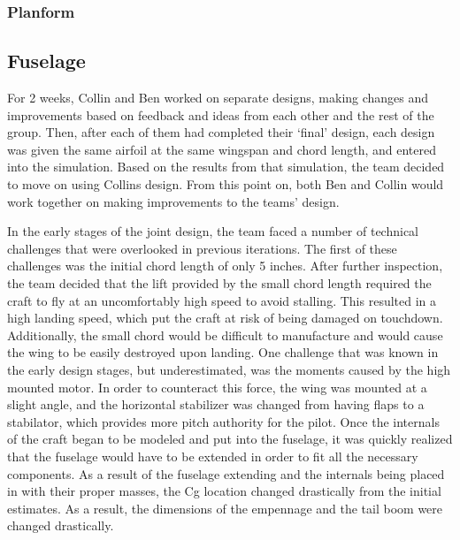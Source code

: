 \documentclass[letterpaper,12pt]{article}
\begin{document}
\subsubsection{Planform}\label{sec:studies:wing:form} %



\subsection{Fuselage}\label{sec:studies:fuse}
For 2 weeks, Collin and Ben worked on separate designs, making changes and improvements based on feedback and ideas from each other and the rest of the group. Then, after each of them had completed their ‘final’ design, each design was given the same airfoil at the same wingspan and chord length, and entered into the simulation. Based on the results from that simulation, the team decided to move on using Collins design. From this point on, both Ben and Collin would work together on making improvements to the teams’ design. 
    
In the early stages of the joint design, the team faced a number of technical challenges that were overlooked in previous iterations. The first of these challenges was the initial chord length of only 5 inches. After further inspection, the team decided that the lift provided by the small chord length required the craft to fly at an uncomfortably high speed to avoid stalling. This resulted in a high landing speed, which put the craft at risk of being damaged on touchdown. Additionally, the small chord would be difficult to manufacture and would cause the wing to be easily destroyed upon landing. One challenge that was known in the early design stages, but underestimated, was the moments caused by the high mounted motor. In order to counteract this force, the wing was mounted at a slight angle, and the horizontal stabilizer was changed from having flaps to a stabilator, which provides more pitch authority for the pilot. Once the internals of the craft began to be modeled and put into the fuselage, it was quickly realized that the fuselage would have to be extended in order to fit all the necessary components. As a result of the fuselage extending and the internals being placed in with their proper masses, the Cg location changed drastically from the initial estimates. As a result, the dimensions of the empennage and the tail boom were changed drastically. 
\end{document}
